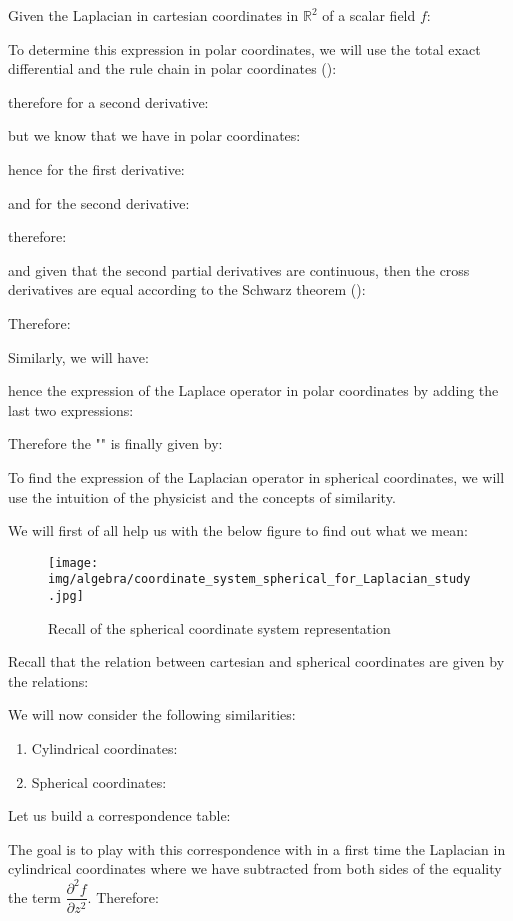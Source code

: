 	Given the Laplacian in cartesian coordinates in $\mathbb{R}^2$ of a scalar field $f$:
	
	To determine this expression in polar coordinates, we will use the total exact differential and the rule chain in polar coordinates ():
	
	therefore for a second derivative:
	
	but we know that we have in polar coordinates:
	
	hence for the first derivative:
	
	and for the second derivative:
	
	therefore:
	
	and given that the second partial derivatives are continuous, then the cross derivatives are equal according to the Schwarz theorem ():
	
	Therefore:
	
	Similarly, we will have:
	
	hence the expression of the Laplace operator in polar coordinates by adding the last two expressions:
	
	Therefore the "" is finally given by:
	
	To find the expression of the Laplacian operator in spherical coordinates, we will use the intuition of the physicist and the concepts of similarity.
	
	We will first of all help us with the below figure to find out what we mean:
	\begin{figure}[H]
		\centering
		\texttt{[image: img/algebra/coordinate\_system\_spherical\_for\_Laplacian\_study.jpg]}
		\caption[]{Recall of the spherical coordinate system representation}
	\end{figure}
	Recall that the relation between cartesian and spherical coordinates are given by the relations:
	
	We will now consider the following similarities:
	\begin{enumerate}
		\item Cylindrical coordinates:
			
		
		\item Spherical coordinates:
			
	\end{enumerate}
	Let us build a correspondence table:
	
	The goal is to play with this correspondence with in a first time the Laplacian in cylindrical coordinates where we have subtracted from both sides of the equality the term $\dfrac{\partial^2 f}{\partial z^2}$. Therefore:
	
